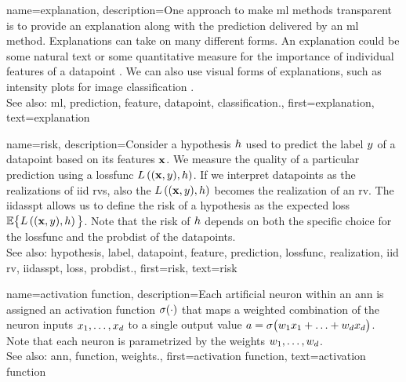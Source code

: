 {name={explanation},
	description={One approach to make \gls{ml} methods transparent is to provide an 
		explanation along with the \gls{prediction} delivered by an 
		\gls{ml} method. Explanations can take on many different forms. An explanation 
		could be some natural text or some quantitative measure for the importance 
		of individual \glspl{feature} of a \gls{datapoint} \cite{Molnar2019}. We can also 
		use visual forms of explanations, such as intensity plots for image \gls{classification} \cite{GradCamPaper}.
					\\ 
		See also: \gls{ml}, \gls{prediction}, \gls{feature}, \gls{datapoint}, \gls{classification}.},
	first={explanation},
	text={explanation} 
}

{name={risk},
	description={Consider a \gls{hypothesis} $h$ used to predict the \gls{label} 
		$y$ of a \gls{datapoint} based on its \glspl{feature} ${\bf x}$. We measure 
		the quality of a particular \gls{prediction} using a \gls{lossfunc} $L\left(({\bf x},y),h \right)$. 
		If we interpret \glspl{datapoint} as the \glspl{realization} of \gls{iid} \glspl{rv}, 
		also the $L\left(({\bf x},y),h \right)$ becomes the \gls{realization} 
		of an \gls{rv}. The \gls{iidasspt} allows us to define the risk of a \gls{hypothesis} 
		as the expected \gls{loss} $\mathbb{E} \big\{L\left(({\bf x},y),h \right) \big\}$. 
		Note that the risk of $h$ depends on both the specific choice for the \gls{lossfunc} and the 
		\gls{probdist} of the \glspl{datapoint}.
					\\ 
		See also: \gls{hypothesis}, \gls{label}, \gls{datapoint}, \gls{feature}, \gls{prediction}, \gls{lossfunc}, \gls{realization}, \gls{iid} \gls{rv}, \gls{iidasspt}, \gls{loss}, \gls{probdist}.},
	first={risk},
	text={risk} 
}

{name={activation function},
	description={Each artificial neuron within an \gls{ann} is 
		assigned an activation \gls{function} $\sigma(\cdot)$ that maps a weighted combination of 
		the neuron inputs $x_{1},\ldots,x_{d}$ to a single output 
		value $a = \sigma\big(w_{1} x_{1}+\ldots+w_{d} x_{d} \big)$. 
		Note that each neuron is parametrized by the \gls{weights} $w_{1},\ldots,w_{d}$.
					\\ 
		See also: \gls{ann}, \gls{function}, \gls{weights}.},
	first={activation function},
	text={activation function} 
}

